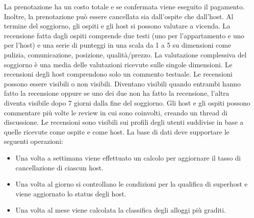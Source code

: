 La prenotazione ha un costo totale e se confermata viene eseguito il pagamento. Inoltre, la
prenotazione può essere cancellata sia dall’ospite che dall’host.
\newline
\newline
Al termine del soggiorno, gli ospiti e gli host si possono valutare a vicenda. La recensione
fatta dagli ospiti comprende due testi (uno per l’appartamento e uno per l’host) e una serie di
punteggi in una scala da 1 a 5 su dimensioni come pulizia, comunicazione, posizione,
qualità/prezzo. La valutazione complessiva del soggiorno è una media delle valutazioni
ricevute sulle singole dimensioni. Le recensioni degli host comprendono solo un commento
testuale. Le recensioni possono essere visibili o non visibili. Diventano visibili quando
entrambi hanno fatto la recensione oppure se uno dei due non ha fatto la recensione, l’altra
diventa visibile dopo 7 giorni dalla fine del soggiorno. Gli host e gli ospiti possono
commentare più volte le review in cui sono coinvolti, creando un thread di discussione.
Le recensioni sono visibili sui profili degli utenti suddivise in base a quelle ricevute come
ospite e come host. La base di dati deve supportare le seguenti operazioni:
\begin{itemize}
    \item Una volta a settimana viene effettuato un calcolo per aggiornare il tasso di
    cancellazione di ciascun host.
    \item Una volta al giorno si controllano le condizioni per la qualifica di superhost e viene
    aggiornato lo status degli host.
    \item Una volta al mese viene calcolata la classifica degli alloggi più graditi.
\end{itemize}
